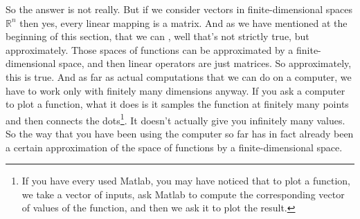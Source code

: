 So the answer is not really.  But if we consider vectors in
finite-dimensional spaces ${\mathbb R}^n$ then yes, every linear mapping is a
matrix.
And as we have mentioned at the beginning of this section, that we can
, well that's not strictly true, but
approximately.  Those  spaces of functions can
be approximated by a finite-dimensional space, and then linear operators
are just matrices.  So approximately, this is true.  And as far as actual
computations that we can do on a computer, we have to work only with
finitely many dimensions anyway.  If you ask a computer to plot a function,
what it does is it samples the function at finitely many points and then
connects the dots\footnote{If you have every used Matlab, you may have
noticed that to plot a function, we take a vector of inputs, ask Matlab
to compute the corresponding vector of values of the function, and then we ask
it to plot the result.}.
It doesn't actually give you infinitely many values.
So the way that you have been using the computer so far has in fact
already been a certain approximation of the space of functions by a
finite-dimensional space.

\medskip

